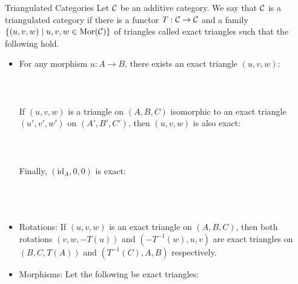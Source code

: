 \documentclass[a4paper]{article}
\begin{document}
\begin{defn}{Triangulated Categories}{} Let $\mathcal{C}$ be an additive category. We say that $\mathcal{C}$ is a triangulated category if there is a functor $T:\mathcal{C}\to\mathcal{C}$ and a family $\{(u,v,w)\;|\;u,v,w\in\text{Mor}(\mathcal{C})\}$ of triangles called exact triangles such that the following hold. 
\begin{itemize}
\item For any morphism $u:A\to B$, there exists an exact triangle $(u,v,w)$: \\~\\
\\~\\ 
If $(u,v,w)$ is a triangle on $(A,B,C)$ isomorphic to an exact triangle $(u',v',w')$ on $(A',B',C')$, then $(u,v,w)$ is also exact: \\~\\
\\~\\ 
Finally, $(\text{id}_A,0,0)$ is exact: \\~\\
\\~\\ 
\item Rotations: If $(u,v,w)$ is an exact triangle on $(A,B,C)$, then both rotations $(v,w,-T(u))$ and $(-T^{-1}(w),u,v)$ are exact triangles on $(B,C,T(A))$ and $(T^{-1}(C),A,B)$ respectively. 
\item Morphisms: Let the following be exact triangles: \\~\\

\end{itemize}
\end{defn}
\end{document}
